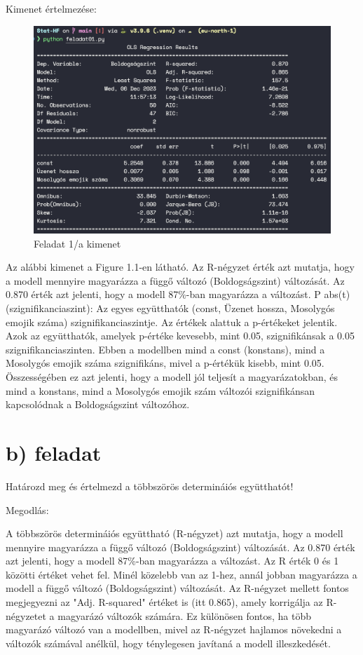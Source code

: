 \documentclass[11pt,a4paper,oneside]{report}
\begin{document}
Kimenet értelmezése:
\begin{figure}[!ht]
  \begin{center}
    \includegraphics[scale=0.4]{1.1.png}
    \caption{Feladat 1/a kimenet}
    \label{fig:TexnicCenter}
  \end{center}
\end{figure}
Az alábbi kimenet a Figure 1.1-en látható. Az R-négyzet érték azt mutatja, hogy a modell mennyire magyarázza a függő változó (Boldogságszint) változását. Az 0.870 érték azt jelenti, hogy a modell 87\%-ban magyarázza a változást.
P \> abs(t) (szignifikanciaszint): Az egyes együtthatók (const, Üzenet hossza, Mosolygós emojik száma) szignifikanciaszintje. Az értékek alattuk a p-értékeket jelentik. Azok az együtthatók, amelyek p-értéke kevesebb, mint 0.05, szignifikánsak a 0.05 szignifikanciaszinten. Ebben a modellben mind a const (konstans), mind a Mosolygós emojik száma szignifikáns, mivel a p-értékük kisebb, mint 0.05.
Összességében ez azt jelenti, hogy a modell jól teljesít a magyarázatokban, és mind a konstans, mind a Mosolygós emojik szám változói szignifikánsan kapcsolódnak a Boldogságszint változóhoz.
\section{b) feladat}
Határozd meg és értelmezd a többszörös determináiós együtthatót!

Megodlás:

A többszörös determináiós együttható (R-négyzet) azt mutatja, hogy a modell mennyire magyarázza a függő változó (Boldogságszint) változását. Az 0.870 érték azt jelenti, hogy a modell 87\%-ban magyarázza a változást.
Az R érték 0 és 1 közötti értéket vehet fel. Minél közelebb van az 1-hez, annál jobban magyarázza a modell a függő változó (Boldogságszint) változását.
Az R-négyzet mellett fontos megjegyezni az "Adj. R-squared" értéket is (itt 0.865), amely korrigálja az R-négyzetet a magyarázó változók számára. Ez különösen fontos, ha több magyarázó változó van a modellben, mivel az R-négyzet hajlamos növekedni a változók számával anélkül, hogy ténylegesen javítaná a modell illeszkedését.
\end{document}
